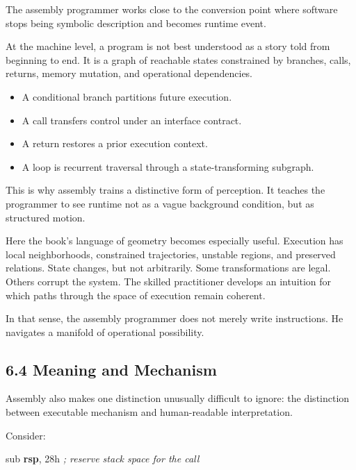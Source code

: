 \documentclass[
]{article}
\newenvironment{Shaded}{}{}
\newcommand{\BaseNTok}[1]{\textcolor[rgb]{0.25,0.63,0.44}{#1}}
\newcommand{\BuiltInTok}[1]{#1}
\newcommand{\CommentTok}[1]{\textcolor[rgb]{0.38,0.63,0.69}{\textit{#1}}}
\newcommand{\KeywordTok}[1]{\textcolor[rgb]{0.00,0.44,0.13}{\textbf{#1}}}
\providecommand{\tightlist}{%
  \setlength{\itemsep}{0pt}\setlength{\parskip}{0pt}}
\begin{document}
The assembly programmer works close to the conversion point where
software stops being symbolic description and becomes runtime event.

At the machine level, a program is not best understood as a story told
from beginning to end. It is a graph of reachable states constrained by
branches, calls, returns, memory mutation, and operational dependencies.

\begin{itemize}
\tightlist
\item
  A conditional branch partitions future execution.
\item
  A call transfers control under an interface contract.
\item
  A return restores a prior execution context.
\item
  A loop is recurrent traversal through a state-transforming subgraph.
\end{itemize}

This is why assembly trains a distinctive form of perception. It teaches
the programmer to see runtime not as a vague background condition, but
as structured motion.

Here the book's language of geometry becomes especially useful.
Execution has local neighborhoods, constrained trajectories, unstable
regions, and preserved relations. State changes, but not arbitrarily.
Some transformations are legal. Others corrupt the system. The skilled
practitioner develops an intuition for which paths through the space of
execution remain coherent.

In that sense, the assembly programmer does not merely write
instructions. He navigates a manifold of operational possibility.

\hypertarget{meaning-and-mechanism}{%
\subsection{6.4 Meaning and Mechanism}\label{meaning-and-mechanism}}

Assembly also makes one distinction unusually difficult to ignore: the
distinction between executable mechanism and human-readable
interpretation.

Consider:

\begin{Shaded}
\begin{Highlighting}[]
\BuiltInTok{sub} \KeywordTok{rsp}\BaseNTok{, 28h      }\CommentTok{; reserve stack space for the call}
\end{Highlighting}
\end{Shaded}
\end{document}
